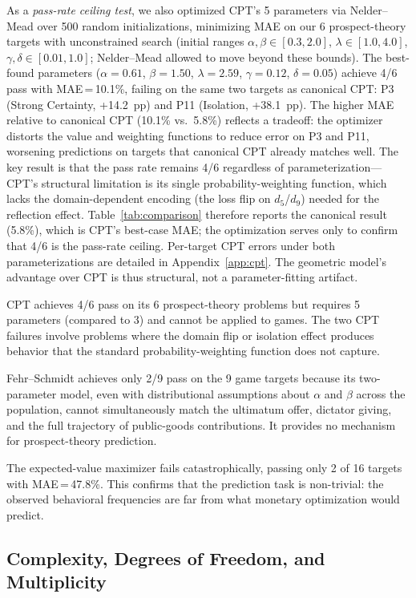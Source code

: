 \documentclass[journal]{IEEEtran}
\begin{document}
As a \emph{pass-rate ceiling test}, we also optimized CPT's 5 parameters via Nelder--Mead over 500 random initializations, minimizing MAE on our 6 prospect-theory targets with unconstrained search (initial ranges $\alpha, \beta \in [0.3, 2.0]$, $\lambda \in [1.0, 4.0]$, $\gamma, \delta \in [0.01, 1.0]$; Nelder--Mead allowed to move beyond these bounds).
The best-found parameters ($\alpha = 0.61$, $\beta = 1.50$, $\lambda = 2.59$, $\gamma = 0.12$, $\delta = 0.05$) achieve 4/6 pass with MAE\,=\,10.1\%, failing on the same two targets as canonical CPT: P3 (Strong Certainty, +14.2~pp) and P11 (Isolation, +38.1~pp).
The higher MAE relative to canonical CPT (10.1\% vs.\ 5.8\%) reflects a tradeoff: the optimizer distorts the value and weighting functions to reduce error on P3 and P11, worsening predictions on targets that canonical CPT already matches well.
The key result is that the pass rate remains 4/6 regardless of parameterization---CPT's structural limitation is its single probability-weighting function, which lacks the domain-dependent encoding (the loss flip on $d_5$/$d_9$) needed for the reflection effect.
Table~\ref{tab:comparison} therefore reports the canonical result (5.8\%), which is CPT's best-case MAE; the optimization serves only to confirm that 4/6 is the pass-rate ceiling.
Per-target CPT errors under both parameterizations are detailed in Appendix~\ref{app:cpt}.
The geometric model's advantage over CPT is thus structural, not a parameter-fitting artifact.

CPT achieves 4/6 pass on its 6 prospect-theory problems but requires 5 parameters (compared to 3) and cannot be applied to games.
The two CPT failures involve problems where the domain flip or isolation effect produces behavior that the standard probability-weighting function does not capture.

Fehr--Schmidt achieves only 2/9 pass on the 9 game targets because its two-parameter model, even with distributional assumptions about $\alpha$ and $\beta$ across the population, cannot simultaneously match the ultimatum offer, dictator giving, and the full trajectory of public-goods contributions.
It provides no mechanism for prospect-theory prediction.

The expected-value maximizer fails catastrophically, passing only 2 of 16 targets with MAE\,=\,47.8\%.
This confirms that the prediction task is non-trivial: the observed behavioral frequencies are far from what monetary optimization would predict.

\subsection{Complexity, Degrees of Freedom, and Multiplicity}
\end{document}
